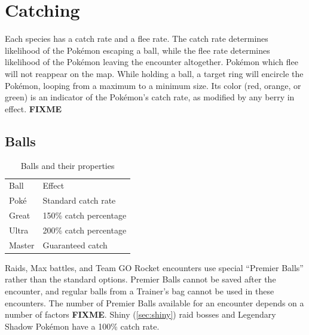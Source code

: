 \section{Catching}
\label{sec:catch}
Each species has a catch rate and a flee rate.
The catch rate determines likelihood of the Pokémon escaping a ball,
  while the flee rate determines likelihood of the Pokémon leaving the encounter altogether.
Pokémon which flee will not reappear on the map.
While holding a ball, a target ring will encircle the Pokémon, looping from a maximum to a minimum size.
Its color (red, orange, or green) is an indicator of the Pokémon's catch rate, as modified by any berry in effect.
\textbf{FIXME}
\subsection{Balls}
\begin{table}[ht]
  \begin{center}
    \begin{tabular}{ll}
      Ball & Effect\\
      \Midrule
      Poké & Standard catch rate\\
      Great & 150\% catch percentage\\
      Ultra & 200\% catch percentage\\
      Master & Guaranteed catch\\
    \end{tabular}
  \end{center}
  \caption{Balls and their properties}
  \label{table:balls}
\end{table}
Raids, Max battles, and Team GO Rocket encounters use special ``Premier Balls''
  rather than the standard options.
Premier Balls cannot be saved after the encounter, and regular balls from
  a Trainer's bag cannot be used in these encounters.
The number of Premier Balls available for an encounter depends on a number of factors \textbf{FIXME}.
Shiny (\autoref{sec:shiny}) raid bosses and Legendary Shadow Pokémon have a 100\% catch rate.

